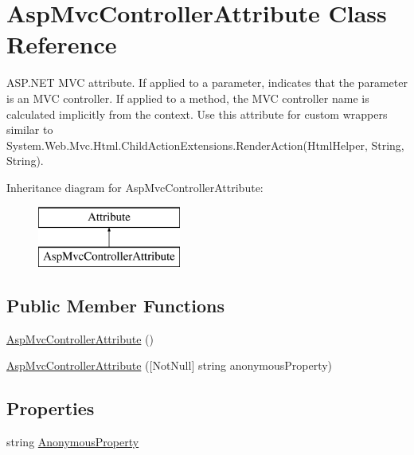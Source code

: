 \hypertarget{class_asp_mvc_controller_attribute}{}\section{Asp\+Mvc\+Controller\+Attribute Class Reference}
\label{class_asp_mvc_controller_attribute}


A\+S\+P.\+N\+ET M\+VC attribute. If applied to a parameter, indicates that the parameter is an M\+VC controller. If applied to a method, the M\+VC controller name is calculated implicitly from the context. Use this attribute for custom wrappers similar to {\ttfamily System.\+Web.\+Mvc.\+Html.\+Child\+Action\+Extensions.\+Render\+Action(\+Html\+Helper, String, String)}.  


Inheritance diagram for Asp\+Mvc\+Controller\+Attribute\+:\begin{figure}[H]
\begin{center}
\leavevmode
\includegraphics[height=2.000000cm]{class_asp_mvc_controller_attribute}
\end{center}
\end{figure}
\subsection*{Public Member Functions}
\begin{DoxyCompactItemize}
\item 
\mbox{\hyperlink{class_asp_mvc_controller_attribute_ae20327545a89d7ad0f17c76fd0bdcb0f}{Asp\+Mvc\+Controller\+Attribute}} ()
\item 
\mbox{\hyperlink{class_asp_mvc_controller_attribute_ae05b815dd8d8729a85430d575344a2c1}{Asp\+Mvc\+Controller\+Attribute}} (\mbox{[}Not\+Null\mbox{]} string anonymous\+Property)
\end{DoxyCompactItemize}
\subsection*{Properties}
\begin{DoxyCompactItemize}
\item 
string \mbox{\hyperlink{class_asp_mvc_controller_attribute_adb49d7099fe6a2366db45aca2e3488ab}{Anonymous\+Property}}
\end{DoxyCompactItemize}


